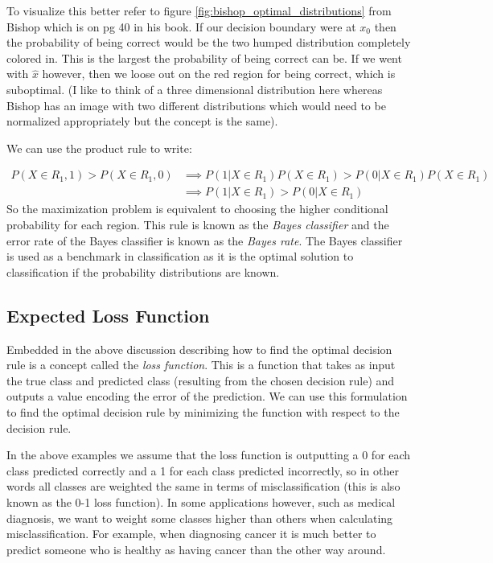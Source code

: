 To visualize this better refer to figure \ref{fig:bishop_optimal_distributions} from Bishop which is on pg 40 in his book. If our decision boundary were at $x_0$ then the probability of being correct would be the two humped distribution completely colored in. This is the largest the probability of being correct can be. If we went with $\hat{x}$ however, then we loose out on the red region for being correct, which is suboptimal. (I like to think of a three dimensional distribution here whereas Bishop has an image with two different distributions which would need to be normalized appropriately but the concept is the same).

 We can use the product rule to write:
 
 \begin{equation}
 \begin{split}
 P(X\in R_1, 1) >  P(X\in R_1, 0)  & \implies  P(1|X\in R_1) P(X \in R_1) > P(0|X\in R_1) P(X \in R_1) \\
 & \implies  P(1|X\in R_1) > P(0|X\in R_1) 
 \end{split}
 \end{equation}
 So the maximization problem is equivalent to choosing the higher conditional probability for each region. This rule is known as the \emph{Bayes classifier} and the error rate of the Bayes classifier is known as the \emph{Bayes rate}. The Bayes classifier is used as a benchmark in classification as it is the optimal solution to classification if the probability distributions are known.
 
\subsection{Expected Loss Function}
Embedded in the above discussion describing how to find the optimal decision rule is a concept called the \emph{loss function}. This is a function that takes as input the true class and predicted class (resulting from the chosen decision rule) and outputs a value encoding the error of the prediction. We can use this formulation to find the optimal decision rule by minimizing the function with respect to the decision rule.

In the above examples we assume that the loss function is outputting a 0 for each class predicted correctly and a 1 for each class predicted incorrectly, so in other words all classes are weighted the same in terms of misclassification (this is also known as the 0-1 loss function). In some applications however, such as medical diagnosis, we want to weight some classes higher than others when calculating misclassification. For example, when diagnosing cancer it is much better to predict someone who is healthy as having cancer than the other way around.

